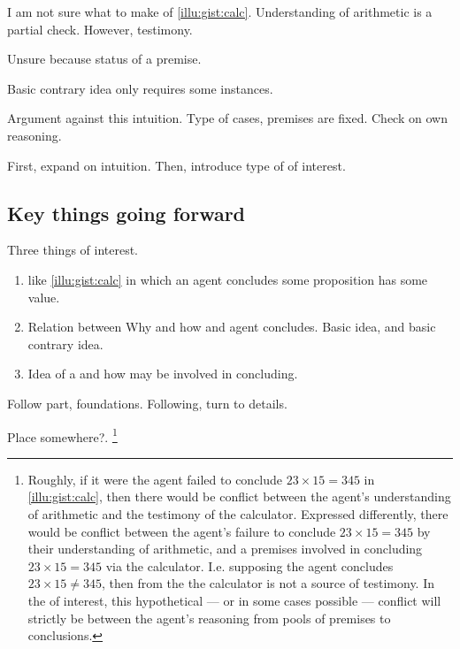 \begin{note}
  I am not sure what to make of \ref{illu:gist:calc}.
  Understanding of arithmetic is a partial check.
  However, testimony.

  Unsure because status of a premise.

  Basic contrary idea only requires some instances.

  Argument against this intuition.
  Type of cases, premises are fixed.
  Check on own reasoning.

  First, expand on intuition.
  Then, introduce type of  of interest.
\end{note}

\subsection{Key things going forward}

\begin{note}
  Three things of interest.

  \begin{enumerate}
  \item
     like \autoref{illu:gist:calc} in which an agent concludes some proposition has some value.
  \item
    Relation between Why and how and agent concludes.
    Basic idea, and basic contrary idea.
  \item
    Idea of a \fc{} and how  may be involved in concluding.
  \end{enumerate}
\end{note}


\begin{note}
  Follow part, foundations.
  Following, turn to details.

{\color{red} Place somewhere?}.%
  \footnote{
    Roughly, if it were the agent failed to conclude \(23 \times 15 = 345\) in \autoref{illu:gist:calc}, then there would be conflict between the agent's understanding of arithmetic and the testimony of the calculator.
    Expressed differently, there would be conflict between the agent's failure to conclude \(23 \times 15 = 345\) by their understanding of arithmetic, and a premises involved in concluding \(23 \times 15 = 345\) via the calculator.
    I.e. supposing the agent concludes \(23 \times 15 \ne 345\), then from the \agpe{} the calculator is not a source of testimony.
    In the  of interest, this hypothetical --- or in some cases possible --- conflict will strictly be between the agent's reasoning from pools of premises to conclusions.
  }
\end{note}



